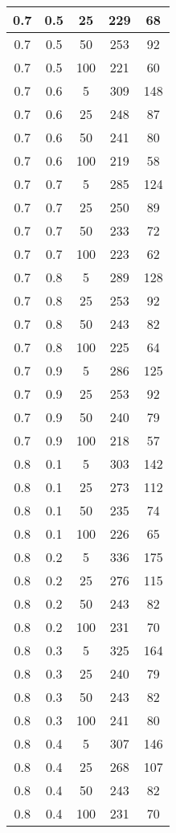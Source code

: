 \begin{appendices}
\begin{center}
\begin{longtable}[c]{|c|c|c|c|c|}
		0.7& 0.5& 25& 229&  68\\
		\hline
		0.7& 0.5& 50& 253&  92\\
		\hline
		0.7& 0.5& 100& 221&  60\\
		\hline
		0.7& 0.6& 5& 309&  148\\
		\hline
		0.7& 0.6& 25& 248&  87\\
		\hline
		0.7& 0.6& 50& 241&  80\\
		\hline
		0.7& 0.6& 100& 219&  58\\
		\hline
		0.7& 0.7& 5& 285&  124\\
		\hline
		0.7& 0.7& 25& 250&  89\\
		\hline
		0.7& 0.7& 50& 233&  72\\
		\hline
		0.7& 0.7& 100& 223&  62\\
		\hline
		0.7& 0.8& 5& 289&  128\\
		\hline
		0.7& 0.8& 25& 253&  92\\
		\hline
		0.7& 0.8& 50& 243&  82\\
		\hline
		0.7& 0.8& 100& 225&  64\\
		\hline
		0.7& 0.9& 5& 286&  125\\
		\hline
		0.7& 0.9& 25& 253&  92\\
		\hline
		0.7& 0.9& 50& 240&  79\\
		\hline
		0.7& 0.9& 100& 218&  57\\
		\hline
		0.8& 0.1& 5& 303&  142\\
		\hline
		0.8& 0.1& 25& 273&  112\\
		\hline
		0.8& 0.1& 50& 235&  74\\
		\hline
		0.8& 0.1& 100& 226&  65\\
		\hline
		0.8& 0.2& 5& 336&  175\\
		\hline
		0.8& 0.2& 25& 276&  115\\
		\hline
		0.8& 0.2& 50& 243&  82\\
		\hline
		0.8& 0.2& 100& 231&  70\\
		\hline
		0.8& 0.3& 5& 325&  164\\
		\hline
		0.8& 0.3& 25& 240&  79\\
		\hline
		0.8& 0.3& 50& 243&  82\\
		\hline
		0.8& 0.3& 100& 241&  80\\
		\hline
		0.8& 0.4& 5& 307&  146\\
		\hline
		0.8& 0.4& 25& 268&  107\\
		\hline
		0.8& 0.4& 50& 243&  82\\
		\hline
		0.8& 0.4& 100& 231&  70\\

\end{longtable}
\end{center}
\end{appendices}
